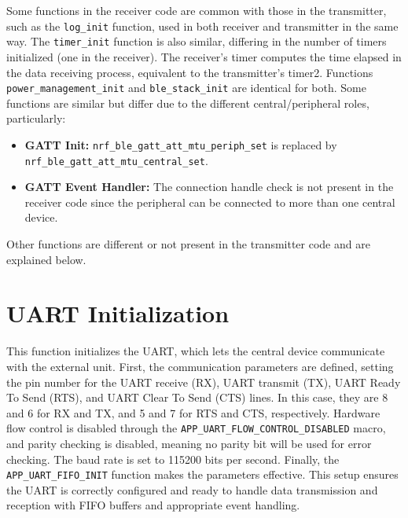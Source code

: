 \documentclass{Configuration_Files/PoliMi3i_thesis}
\begin{document}
Some functions in the receiver code are common with those in the transmitter, such as the \texttt{log\_init} function, used in both receiver and transmitter in the same way. The \texttt{timer\_init} function is also similar, differing in the number of timers initialized (one in the receiver). The receiver’s timer computes the time elapsed in the data receiving process, equivalent to the transmitter’s timer2. Functions \texttt{power\_management\_init} and \texttt{ble\_stack\_init} are identical for both. Some functions are similar but differ due to the different central/peripheral roles, particularly:
\begin{itemize}
    \item \textbf{GATT Init:} \texttt{nrf\_ble\_gatt\_att\_mtu\_periph\_set} is replaced by \texttt{nrf\_ble\_gatt\_att\_mtu\_central\_set}.
    \item \textbf{GATT Event Handler:} The connection handle check is not present in the receiver code since the peripheral can be connected to more than one central device.
\end{itemize}

Other functions are different or not present in the transmitter code and are explained below.

\section*{UART Initialization}

This function initializes the UART, which lets the central device communicate with the external unit. First, the communication parameters are defined, setting the pin number for the UART receive (RX), UART transmit (TX), UART Ready To Send (RTS), and UART Clear To Send (CTS) lines. In this case, they are 8 and 6 for RX and TX, and 5 and 7 for RTS and CTS, respectively. Hardware flow control is disabled through the \texttt{APP\_UART\_FLOW\_CONTROL\_DISABLED} macro, and parity checking is disabled, meaning no parity bit will be used for error checking. The baud rate is set to 115200 bits per second. Finally, the \texttt{APP\_UART\_FIFO\_INIT} function makes the parameters effective. This setup ensures the UART is correctly configured and ready to handle data transmission and reception with FIFO buffers and appropriate event handling.
\end{document}
